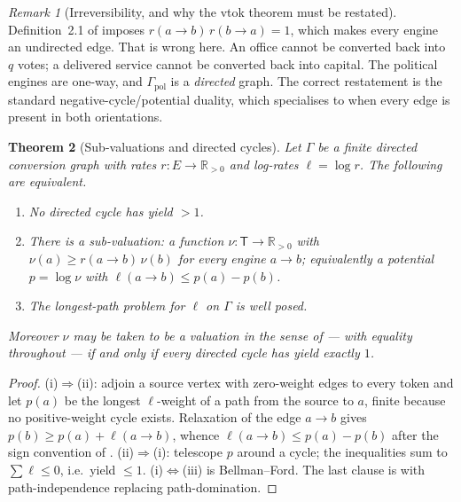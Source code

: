 \documentclass[11pt]{article}
\theoremstyle{plain}
\newtheorem{theorem}{Theorem}[section]
\theoremstyle{definition}
\theoremstyle{remark}
\newtheorem{remark}[theorem]{Remark}
\newcommand{\Tok}{\mathsf{T}}
\newcommand{\Rpos}{\mathbb{R}_{>0}}
\begin{document}
\begin{remark}[Irreversibility, and why the vtok theorem must be restated]
\label{rem:irrev}
Definition~2.1 of \cite{vtok} imposes $r(a\to b)\,r(b\to a) = 1$, which makes
every engine an undirected edge. That is wrong here. An office cannot be
converted back into $q$ votes; a delivered service cannot be converted back into
capital. The political engines are one-way, and $\Gamma_{\mathrm{pol}}$ is a
\emph{directed} graph. The correct restatement is the standard
negative-cycle/potential duality, which specialises to \cite[Thm.~3.3]{vtok}
when every edge is present in both orientations.
\end{remark}

\begin{theorem}[Sub-valuations and directed cycles]
\label{thm:ftap}
Let $\Gamma$ be a finite directed conversion graph with rates
$r : E \to \Rpos$ and log-rates $\ell = \log r$. The following are equivalent.
\begin{enumerate}[label=\textup{(\roman*)},leftmargin=2.2em]
\item No directed cycle has yield $>1$.
\item There is a \emph{sub-valuation}: a function $\nu : \Tok \to \Rpos$ with
$\nu(a) \ge r(a\to b)\,\nu(b)$ for every engine $a \to b$; equivalently a
potential $p = \log\nu$ with $\ell(a\to b) \le p(a) - p(b)$.
\item The longest-path problem for $\ell$ on $\Gamma$ is well posed.
\end{enumerate}
Moreover $\nu$ may be taken to be a valuation in the sense of
\cite[Def.~3.2]{vtok} --- with equality throughout --- if and only if every
directed cycle has yield exactly $1$.
\end{theorem}

\begin{proof}
(i)$\Rightarrow$(ii): adjoin a source vertex with zero-weight edges to every
token and let $p(a)$ be the longest $\ell$-weight of a path from the source to
$a$, finite because no positive-weight cycle exists. Relaxation of the edge
$a\to b$ gives $p(b) \ge p(a) + \ell(a\to b)$, whence
$\ell(a\to b) \le p(a) - p(b)$ after the sign convention of
\cite[Def.~3.2]{vtok}. (ii)$\Rightarrow$(i): telescope $p$ around a cycle; the
inequalities sum to $\sum \ell \le 0$, i.e.\ yield $\le 1$.
(i)$\Leftrightarrow$(iii) is Bellman--Ford. The last clause is
\cite[Thm.~3.3]{vtok} with path-independence replacing path-domination.
\end{proof}
\end{document}
